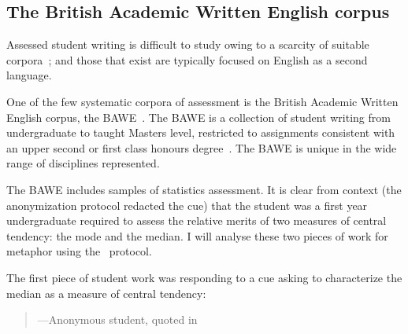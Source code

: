 
\subsection{The British Academic Written English corpus}

Assessed student writing is difficult to study owing to a scarcity of
suitable corpora~\citep{nesi2004}; and those that exist are typically
focused on English as a second language.

One of the few systematic corpora of assessment is the British
Academic Written English corpus, the BAWE~\citep{bawe2016}.  The BAWE
is a collection of student writing from undergraduate to taught
Masters level, restricted to assignments consistent with an upper
second or first class honours degree~\citep{nesi2012}.  The BAWE is
unique in the wide range of disciplines represented.

The BAWE includes samples of statistics assessment.  It is clear from
context (the anonymization protocol redacted the cue) that the student
was a first year undergraduate required to assess the relative merits
of two measures of central tendency: the mode and the median.  I will
analyse these two pieces of work for metaphor using
the~ protocol.

The first piece of student work was responding to a cue asking to
characterize the median as a measure of central tendency:

\begin{singlespace}
\begin{quote}
---Anonymous student, quoted in 
\end{quote}
\end{singlespace}

